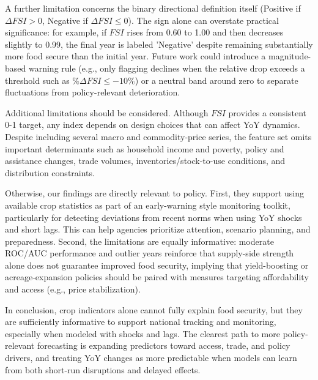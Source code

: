 \documentclass[10pt,twocolumn,letterpaper]{article}
\begin{document}
A further limitation concerns the binary directional definition itself (Positive if $\Delta FSI>0$, Negative if $\Delta FSI\le 0$). The sign alone can overstate practical significance: for example, if $FSI$ rises from 0.60 to 1.00 and then decreases slightly to 0.99, the final year is labeled 'Negative' despite remaining substantially more food secure than the initial year. Future work could introduce a magnitude-based warning rule (e.g., only flagging declines when the relative drop exceeds a threshold such as $\%\Delta FSI \le -10\%$) or a neutral band around zero to separate fluctuations from policy-relevant deterioration.

Additional limitations should be considered. Although $FSI$ provides a consistent 0-1 target, any index depends on design choices that can affect YoY dynamics. Despite including several macro and commodity-price series, the feature set omits important determinants such as household income and poverty, policy and assistance changes, trade volumes, inventories/stock-to-use conditions, and distribution constraints.

Otherwise, our findings are directly relevant to policy. First, they support using available crop statistics as part of an early-warning style monitoring toolkit, particularly for detecting deviations from recent norms when using YoY shocks and short lags. This can help agencies prioritize attention, scenario planning, and preparedness. Second, the limitations are equally informative: moderate ROC/AUC performance and outlier years reinforce that supply-side strength alone does not guarantee improved food security, implying that yield-boosting or acreage-expansion policies should be paired with measures targeting affordability and access (e.g., price stabilization).

In conclusion, crop indicators alone cannot fully explain food security, but they are sufficiently informative to support national tracking and monitoring, especially when modeled with shocks and lags. The clearest path to more policy-relevant forecasting is expanding predictors toward access, trade, and policy drivers, and treating YoY changes as more predictable when models can learn from both short-run disruptions and delayed effects.
\end{document}
